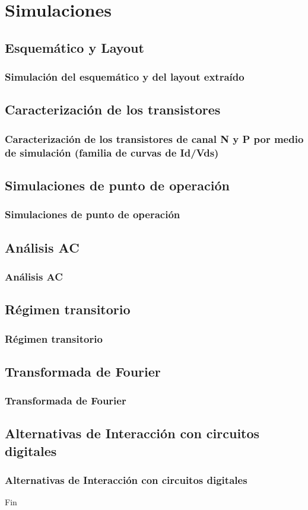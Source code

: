 \documentclass{beamer}
\begin{document}
\section{Simulaciones}
\subsection{Esquemático y Layout}
\begin{frame}
\frametitle{Simulación del esquemático y del layout extraído}
\end{frame}
\subsection{Caracterización de los transistores}
\begin{frame}
\frametitle{Caracterización de los transistores de canal N y P por medio de simulación (familia de curvas de Id/Vds)}
\end{frame}
\subsection{Simulaciones de punto de operación}
\begin{frame}
\frametitle{Simulaciones de punto de operación}
\end{frame}
\subsection{Análisis AC}
\begin{frame}
\frametitle{Análisis AC}
\end{frame}
\subsection{Régimen transitorio}
\begin{frame}
\frametitle{Régimen transitorio}
\end{frame}
\subsection{Transformada de Fourier}
\begin{frame}
\frametitle{Transformada de Fourier}
\end{frame}
\subsection{Alternativas de Interacción con circuitos digitales}
\begin{frame}
\frametitle{Alternativas de Interacción con circuitos digitales}
\end{frame}

\begin{frame}
\Huge{\centerline{Fin}}
\end{frame}

\end{document}
